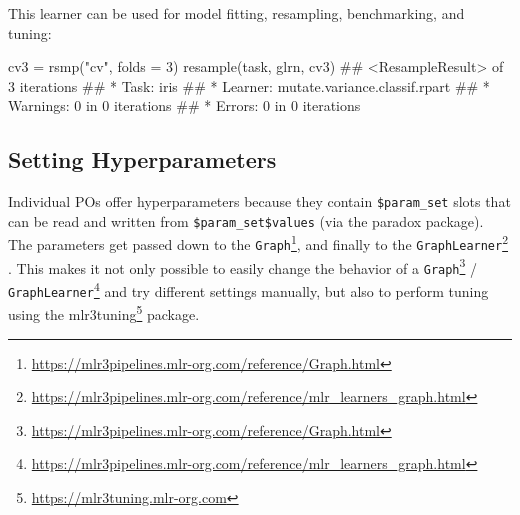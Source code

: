 \documentclass[12pt,]{scrbook}
\newenvironment{Shaded}{}{}
\newcommand{\DataTypeTok}[1]{#1}
\newcommand{\DecValTok}[1]{#1}
\newcommand{\FloatTok}[1]{#1}
\newcommand{\KeywordTok}[1]{\textcolor[rgb]{0.00,0.00,1.00}{#1}}
\newcommand{\NormalTok}[1]{#1}
\newcommand{\OperatorTok}[1]{#1}
\newcommand{\StringTok}[1]{\textcolor[rgb]{0.00,0.50,0.50}{#1}}
\renewcommand{\href}[2]{#2\footnote{\url{#1}}}
\begin{document}
This learner can be used for model fitting, resampling, benchmarking, and tuning:

\begin{Shaded}
\begin{Highlighting}[]
\NormalTok{cv3 =}\StringTok{ }\KeywordTok{rsmp}\NormalTok{(}\StringTok{"cv"}\NormalTok{, }\DataTypeTok{folds =} \DecValTok{3}\NormalTok{)}
\KeywordTok{resample}\NormalTok{(task, glrn, cv3)}
\NormalTok{## <ResampleResult> of 3 iterations}
\NormalTok{## * Task: iris}
\NormalTok{## * Learner: mutate.variance.classif.rpart}
\NormalTok{## * Warnings: 0 in 0 iterations}
\NormalTok{## * Errors: 0 in 0 iterations}
\end{Highlighting}
\end{Shaded}

\hypertarget{pipe-hyperpars}{%
\subsection{Setting Hyperparameters}\label{pipe-hyperpars}}

Individual POs offer hyperparameters because they contain \texttt{\$param\_set} slots that can be read and written from \texttt{\$param\_set\$values} (via the paradox package).
The parameters get passed down to the \href{https://mlr3pipelines.mlr-org.com/reference/Graph.html}{\texttt{Graph}}, and finally to the \href{https://mlr3pipelines.mlr-org.com/reference/mlr_learners_graph.html}{\texttt{GraphLearner}} .
This makes it not only possible to easily change the behavior of a \href{https://mlr3pipelines.mlr-org.com/reference/Graph.html}{\texttt{Graph}} / \href{https://mlr3pipelines.mlr-org.com/reference/mlr_learners_graph.html}{\texttt{GraphLearner}} and try different settings manually, but also to perform tuning using the \href{https://mlr3tuning.mlr-org.com}{mlr3tuning} package.

\begin{Shaded}
\end{Shaded}
\end{document}
